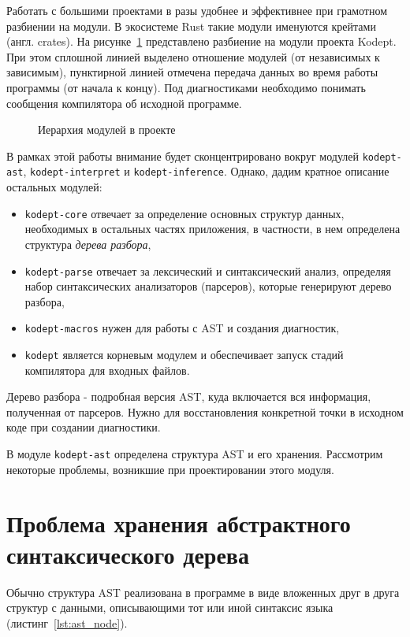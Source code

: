 Работать с большими проектами в разы удобнее и эффективнее при грамотном разбиении на модули.
В экосистеме Rust такие модули именуются крейтами (англ. crates).
На рисунке~\ref{fig:modules} представлено разбиение на модули проекта Kodept.
При этом сплошной линией выделено отношение модулей (от независимых к зависимым), пунктирной линией отмечена передача данных во время работы программы (от начала к концу).
Под диагностиками необходимо понимать сообщения компилятора об исходной программе.

\begin{figure}[H]
    \centering
    
    \caption{Иерархия модулей в проекте}
    \label{fig:modules}
\end{figure}

В рамках этой работы внимание будет сконцентрировано вокруг модулей \lstinline{kodept-ast}, \lstinline{kodept-interpret} и \lstinline{kodept-inference}.
Однако, дадим кратное описание остальных модулей:
\begin{itemize}
    \item \lstinline{kodept-core} отвечает за определение основных структур данных, необходимых в остальных частях приложения, в частности, в нем определена структура \textit{дерева разбора},
    \item \lstinline{kodept-parse} отвечает за лексический и синтаксический анализ, определяя набор синтаксических анализаторов (парсеров), которые генерируют дерево разбора,
    \item \lstinline{kodept-macros} нужен для работы с AST и создания диагностик,
    \item \lstinline{kodept} является корневым модулем и обеспечивает запуск стадий компилятора для входных файлов.
\end{itemize}

Дерево разбора - подробная версия AST, куда включается вся информация, полученная от парсеров.
Нужно для восстановления конкретной точки в исходном коде при создании диагностики.

В модуле \lstinline{kodept-ast} определена структура AST и его хранения.
Рассмотрим некоторые проблемы, возникшие при проектировании этого модуля.

\section{Проблема хранения абстрактного синтаксического дерева}
\label{sec:ast_structure}

Обычно структура AST реализована в программе в виде вложенных друг в друга структур с данными, описывающими тот или иной синтаксис языка (листинг~\ref{lst:ast_node}).

